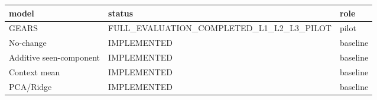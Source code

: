 \begin{tabular}{lll}
\toprule
model & status & role \\
\midrule
GEARS & FULL_EVALUATION_COMPLETED_L1_L2_L3_PILOT & pilot \\
No-change & IMPLEMENTED & baseline \\
Additive seen-component & IMPLEMENTED & baseline \\
Context mean & IMPLEMENTED & baseline \\
PCA/Ridge & IMPLEMENTED & baseline \\
\bottomrule
\end{tabular}

